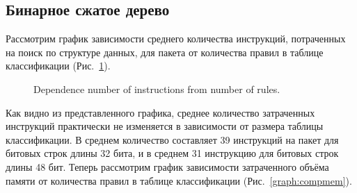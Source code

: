 \documentclass[conference]{IEEEtran}
\begin{document}
        \subsection{Бинарное сжатое дерево}
            Рассмотрим график зависимости среднего количества инструкций, потраченных на поиск по структуре данных, для пакета от количества правил в таблице классификации (Рис.~\ref{graph:compinst}).
            \begin{figure}[h!]
                \centering
                \captionsetup{justification=centering}
                \caption{Dependence number of instructions from number of rules.}
                \label{graph:compinst}
            \end{figure}
            Как видно из представленного графика, среднее количество затраченных инструкций практически не изменяется в зависимости от размера таблицы классификации. 
            В среднем количество составляет 39 инструкций на пакет для битовых строк длины 32 бита, и в среднем 31 инструкцию для битовых строк длины 48 бит.
            Теперь рассмотрим график зависимости затраченного объёма памяти от количества правил в таблице классификации (Рис.~\ref{graph:compmem}).
\end{document}
